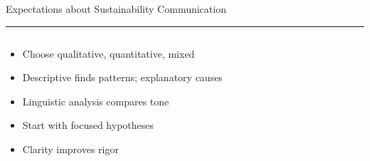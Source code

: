 \documentclass[aspectratio=169]{beamer}
\newcommand{\TitleFont}{\rmfamily}
\begin{document}
\begin{frame}[t]{}
  \vspace*{0.5cm}
  {\TitleFont\fontsize{18}{22}\selectfont\color{LUBronze}Expectations about Sustainability Communication\par}
  \vspace{0.3em}
  {\color{LUBronze}\rule{\linewidth}{0.8pt}}\par
  \vspace{0.2cm}
  \begin{columns}[t]
    \begin{column}[t]{0.45\textwidth}
      \vspace*{0pt}
      \begin{itemize}\setlength\itemsep{0.65em}
        \item Choose qualitative, quantitative, mixed
        \item Descriptive finds patterns; explanatory causes
        \item Linguistic analysis compares tone
        \item Start with focused hypotheses
        \item Clarity improves rigor
      \end{itemize}
    \end{column}
  \end{columns}
\end{frame}
\end{document}
